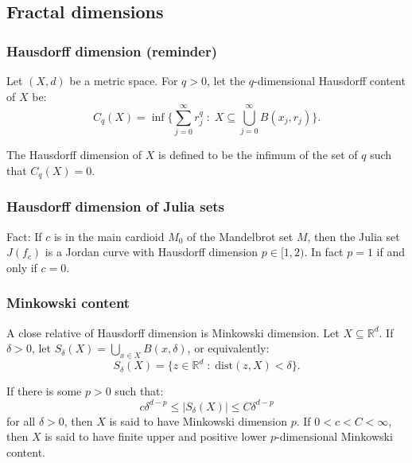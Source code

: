 \documentclass{beamer} %
\theoremstyle{definition} %
\newcommand{\Rl}{\mathbb{R}}
\begin{document}
\subsection{Fractal dimensions}
\begin{frame}\frametitle{Hausdorff dimension (reminder)}
    Let $(X,d)$ be a metric space. For $q > 0$, let the $q$-dimensional Hausdorff content of $X$ be:
    \begin{equation*}
        C_q(X) = \inf\{\sum_{j=0}^\infty r_j^q\;:\;X \subseteq \bigcup_{j =0}^\infty B(x_j,r_j)\}.
    \end{equation*}
    
    The Hausdorff dimension of $X$ is defined to be the infimum of the set of $q$ such that $C_q(X) = 0$.
\end{frame}
% 

\begin{frame}\frametitle{Hausdorff dimension of Julia sets}
    Fact: If $c$ is in the main cardioid $M_0$ of the Mandelbrot set $M$, then the Julia set $J(f_c)$ is a Jordan curve
    with Hausdorff dimension $p \in [1,2)$. In fact $p = 1$ if and only if $c = 0$.
\end{frame}

\begin{frame}\frametitle{Minkowski content}
    A close relative of Hausdorff dimension is Minkowski dimension.
    Let $X \subseteq \Rl^d$. If $\delta > 0$, let $S_\delta(X) = \bigcup_{x \in X} B(x,\delta)$, or equivalently:
    \begin{equation*}
        S_\delta(X) = \{z \in \Rl^d\;:\;\mathrm{dist}(z,X) < \delta\}.
    \end{equation*}
    
    If there is some $p > 0$ such that:
    \begin{equation*}
        c\delta^{d-p} \leq |S_\delta(X)| \leq C\delta^{d-p}
    \end{equation*}
    for all $\delta > 0$, then $X$ is said to have Minkowski dimension $p$. If $0 < c < C < \infty$, then $X$
    is said to have finite upper and positive lower $p$-dimensional Minkowski content.
\end{frame}
\end{document}
